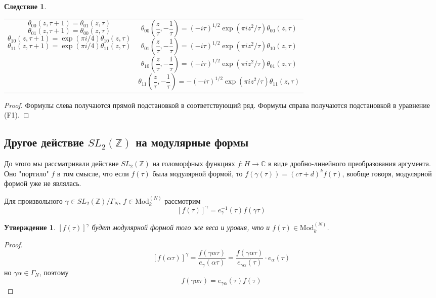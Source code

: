 \documentclass{article}
\newcommand{\ZZ}{\mathbb{Z}}
\newcommand{\CC}{\mathbb{C}}
\theoremstyle{break}
\newtheorem{claim}{Утверждение}[section]
\newtheorem{corollary}{Следствие}[section] %
\newcommand{\ModkN}[2]{\text{Mod}_{#1}^{(#2)}}
\begin{document}
\begin{corollary}
	\begin{tabularx}{\textwidth}{@{}X|X@{}}
		$$\theta_{00}(z, \tau + 1) = \theta_{01}(z, \tau)$$
		$$\theta_{01}(z, \tau + 1) = \theta_{00}(z, \tau)$$
		$$\theta_{10}(z, \tau + 1) = \exp(\pi i/4)\theta_{10}(z, \tau)$$
		$$\theta_{11}(z, \tau + 1) = \exp(\pi i/4)\theta_{11}(z, \tau)$$
		&
		$$\theta_{00}(\frac{z}{\tau}, -\frac{1}{\tau})
			=(-i\tau)^{1/2}\exp(\pi i z^2 / \tau) \theta_{00}(z, \tau)$$
		$$\theta_{01}(\frac{z}{\tau}, -\frac{1}{\tau})
			=(-i\tau)^{1/2}\exp(\pi i z^2 / \tau) \theta_{10}(z, \tau)$$
		$$\theta_{10}(\frac{z}{\tau}, -\frac{1}{\tau})
			=(-i\tau)^{1/2}\exp(\pi i z^2 / \tau) \theta_{01}(z, \tau)$$
		$$\theta_{11}(\frac{z}{\tau}, -\frac{1}{\tau})
			=-(-i\tau)^{1/2}\exp(\pi i z^2 / \tau) \theta_{11}(z, \tau)$$
	\end{tabularx}
\end{corollary}
\begin{proof}
	Формулы слева получаются прямой подстановкой в соответствующий ряд. Формулы справа получаются подстановкой в уравнение (F1).
\end{proof}

\subsection{Другое действие $SL_2(\ZZ)$ на модулярные формы}
До этого мы рассматривали действие $SL_2(\ZZ)$ на голоморфных функциях $f: H \to \CC$
 в виде дробно-линейного преобразования аргумента. Оно "портило" $f$ в том смысле, что если $f(\tau)$ была модулярной формой, то 
 $f(\gamma(\tau)) = (c\tau + d)^kf(\tau)$, вообще говоря,
  модулярной формой уже не являлась.
 
 Для произвольного $\gamma \in SL_2(\ZZ) / \Gamma_N$, $f \in \ModkN{k}{N}$ рассмотрим
 $$
 	[f(\tau)]^\gamma = e_{\gamma}^{-1}(\tau) f(\gamma\tau)
 $$
 
\begin{claim}
	$[f(\tau)]^\gamma$ будет модулярной формой того же веса и уровня, что и 
	$f(\tau) \in \ModkN{k}{N}$.
\end{claim}
\begin{proof}
	$$
	[f(\alpha \tau)]^\gamma = \frac{f(\gamma\alpha\tau)}{e_{\gamma}(\alpha \tau)}
	= \frac{f(\gamma\alpha\tau)}{e_{\gamma\alpha}(\tau)} \cdot e_\alpha(\tau)
	$$
	но $\gamma\alpha \in \Gamma_N$, поэтому
	$$
	f(\gamma\alpha \tau) = e_{\gamma \alpha}(\tau) f(\tau)
	$$
\end{proof}
\end{document}
